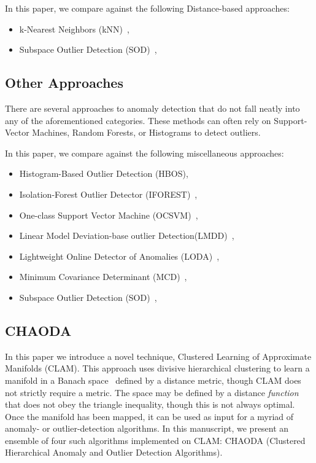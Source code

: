 In this paper, we compare against the following Distance-based approaches:
\begin{itemize}
    \item k-Nearest Neighbors (kNN)~\cite{ramaswamy2000efficient, sridhar2000knn, fabrizio2002knn},
    \item Subspace Outlier Detection (SOD)~\cite{kriegel2009sod},
\end{itemize}


\subsection{Other Approaches}
\label{subsec:introduction:other-appraoches}

There are several approaches to anomaly detection that do not fall neatly into any of the aforementioned categories.
These methods can often rely on Support-Vector Machines, Random Forests, or Histograms to detect outliers.

In this paper, we compare against the following miscellaneous approaches:
\begin{itemize}
    \item Histogram-Based Outlier Detection (HBOS)\cite{goldstein2012hbos},
    \item Isolation-Forest Outlier Detector (IFOREST)~\cite{tony2008iforest,tony2012iforest},
    \item One-class Support Vector Machine (OCSVM)~\cite{sholkopf2001ocsvm},
    \item Linear Model Deviation-base outlier Detection(LMDD)~\cite{arning1996lmdd},
    \item Lightweight Online Detector of Anomalies (LODA)~\cite{pevny2016loda},
    \item Minimum Covariance Determinant (MCD)~\cite{rousseeuw1999mcd,hardin2004mcd},
    \item Subspace Outlier Detection (SOD)~\cite{kriegel2009sod},
\end{itemize}


\subsection{CHAODA}
\label{subsec:introduction:chaoda}

In this paper we introduce a novel technique, Clustered Learning of Approximate Manifolds (CLAM).
This approach uses divisive hierarchical clustering to learn a manifold in a Banach space~\cite{banach1929fonctionnelles} defined by a distance metric, though CLAM does not strictly require a metric.
The space may be defined by a distance \textit{function} that does not obey the triangle inequality, though this is not always optimal.
Once the manifold has been mapped, it can be used as input for a myriad of anomaly- or outlier-detection algorithms.
In this manuscript, we present an ensemble of four such algorithms implemented on CLAM: CHAODA (Clustered Hierarchical Anomaly and Outlier Detection Algorithms).

